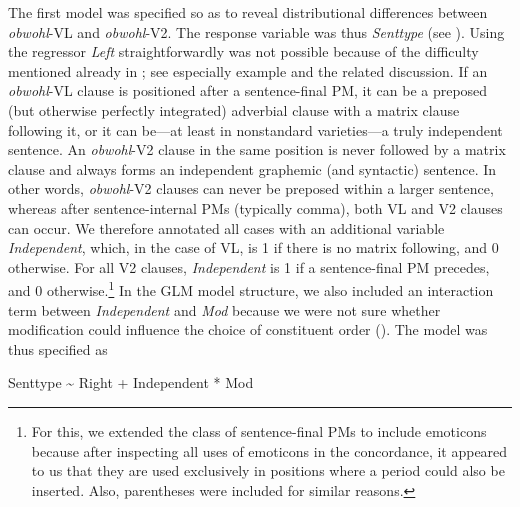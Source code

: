 The first model was specified so as to reveal distributional differences between \textit{obwohl}{}-VL and \textit{obwohl}{}-V2. The response variable was thus \textit{Senttype} (see ). Using the regressor \textit{Left} straightforwardly was not possible because of the difficulty mentioned already in ; see especially example  and the related discussion. If an \textit{obwohl}{}-VL clause is positioned after a sentence-final PM, it can be a preposed (but otherwise perfectly integrated) adverbial clause with a matrix clause following it, or it can be—at least in nonstandard varieties—a truly independent sentence. An \textit{obwohl}{}-V2 clause in the same position is never followed by a matrix clause and always forms an independent graphemic (and syntactic) sentence. In other words, \textit{obwohl}{}-V2 clauses can never be preposed within a larger sentence, whereas after sentence-internal PMs (typically comma), both VL and V2 clauses can occur. We therefore annotated all cases with an additional variable \textit{Independent}, which, in the case of VL, is 1 if there is no matrix following, and 0 otherwise. For all V2 clauses, \textit{Independent} is 1 if a sentence-final PM precedes, and 0 otherwise.\footnote{For this, we extended the class of sentence-final PMs to include emoticons because after inspecting all uses of emoticons in the concordance, it appeared to us that they are used exclusively in positions where a period could also be inserted. Also, parentheses were included for similar reasons.} In the GLM model structure, we also included an interaction term between \textit{Independent} and \textit{Mod} because we were not sure whether modification could influence the choice of constituent order (). The model was thus specified as



Senttype {\textasciitilde} Right + Independent * Mod



